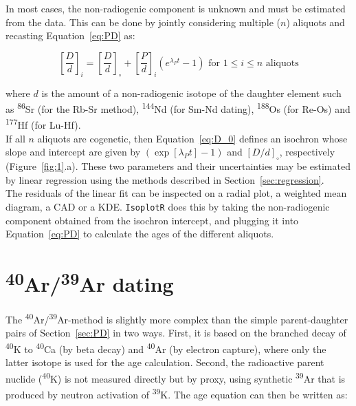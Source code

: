 \documentclass{article}
\begin{document}
In most cases, the non-radiogenic component is unknown and must be
estimated from the data. This can be done by jointly considering
multiple ($n$) aliquots and recasting Equation~\ref{eq:PD} as:

\begin{equation}
  \left[\frac{D}{d}\right]_i = \left[\frac{D}{d}\right]_\circ +
  \left[\frac{P}{d}\right]_i \left(e^{\lambda_Pt} - 1\right)
  \mbox{~for~} 1 \leq i \leq n \mbox{~aliquots}
  \label{eq:D_0}
\end{equation}

\noindent where $d$ is the amount of a non-radiogenic isotope of the
daughter element such as \textsuperscript{86}Sr (for the Rb-Sr
method), \textsuperscript{144}Nd (for Sm-Nd dating),
\textsuperscript{188}Os (for Re-Os) and \textsuperscript{177}Hf (for
Lu-Hf).\\

If all $n$ aliquots are cogenetic, then Equation~\ref{eq:D_0} defines
an isochron whose slope and intercept are given by $(\exp[\lambda_P
  t]-1)$ and $[D/d]_\circ$, respectively (Figure~\ref{fig:1}.a).
These two parameters and their uncertainties may be estimated by
linear regression using the methods described in
Section~\ref{sec:regression}.\\

The residuals of the linear fit can be inspected on a radial plot, a
weighted mean diagram, a CAD or a KDE. \texttt{IsoplotR} does this by
taking the non-radiogenic component obtained from the isochron
intercept, and plugging it into Equation~\ref{eq:PD} to calculate the
ages of the different aliquots.

\section{\textsuperscript{40}Ar/\textsuperscript{39}Ar dating}
\label{sec:ArAr}

The \textsuperscript{40}Ar/\textsuperscript{39}Ar-method is slightly
more complex than the simple parent-daughter pairs of
Section~\ref{sec:PD} in two ways. First, it is based on the branched
decay of \textsuperscript{40}K to \textsuperscript{40}Ca (by beta
decay) and \textsuperscript{40}Ar (by electron capture), where only
the latter isotope is used for the age calculation. Second, the
radioactive parent nuclide (\textsuperscript{40}K) is not measured
directly but by proxy, using synthetic \textsuperscript{39}Ar that is
produced by neutron activation of \textsuperscript{39}K.  The age
equation can then be written as:
\end{document}
